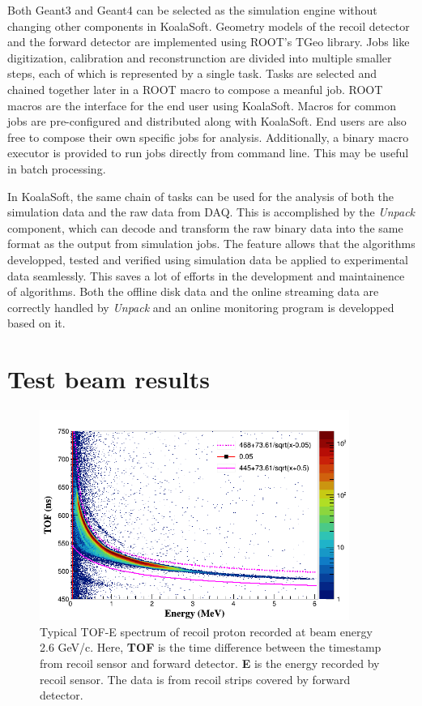 \documentclass[number]{elsarticle}
\begin{document}
Both Geant3 and Geant4 can be selected as the simulation engine without changing other components in KoalaSoft.
Geometry models of the recoil detector and the forward detector are implemented using ROOT's TGeo library.
Jobs like digitization, calibration and reconstrunction are divided into multiple smaller steps, each of which is represented by a single task.
Tasks are selected and chained together later in a ROOT macro to compose a meanful job. 
ROOT macros are the interface for the end user using KoalaSoft.
Macros for common jobs are pre-configured and distributed along with KoalaSoft.
End users are also free to compose their own specific jobs for analysis.
Additionally, a binary macro executor is provided to run jobs directly from command line. This may be useful in batch processing.

In KoalaSoft, the same chain of tasks can be used for the analysis of both the simulation data and the raw data from DAQ.
This is accomplished by the \emph{Unpack} component, which can decode and transform the raw binary data into the same format as the output from simulation jobs.
The feature allows that the algorithms developped, tested and verified using simulation data be applied to experimental data seamlessly.
This saves a lot of efforts in the development and maintainence of algorithms.
Both the offline disk data and the online streaming data are correctly handled by \emph{Unpack} and an online monitoring program is developped based on it.

\section{Test beam results}
\label{sec:result}

\begin{figure}[htbp]
\centering
\includegraphics[width=0.9\textwidth]{./tof_e_cut.png}
\caption{
Typical TOF-E spectrum of recoil proton recorded at beam energy 2.6 GeV/c. Here, \textbf{TOF} is the time difference between the timestamp from recoil sensor and forward detector. \textbf{E} is the energy recorded by recoil sensor. The data is from recoil strips covered by forward detector.}
\label{fig:tof-e}
\end{figure}
\end{document}

